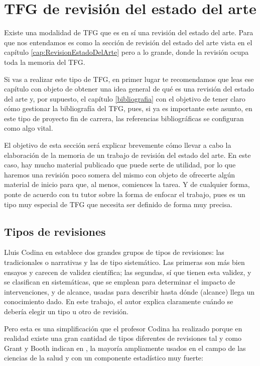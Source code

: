 \section{TFG de revisión del estado del arte}

Existe una modalidad de TFG que es en sí una revisión del estado del arte. Para que nos entendamos es como la sección de revisión del estado del arte vista en el capítulo \ref{cap:RevisionEstadoDelArte} pero a lo grande, donde la revisión ocupa toda la memoria del TFG.

Si vas a realizar este tipo de TFG, en primer lugar te recomendamos que leas ese capítulo con objeto de obtener una idea general de qué es una revisión del estado del arte y, por supuesto, el capítulo \ref{bibliografia} con el objetivo de tener claro cómo gestionar la bibliografía del TFG, pues, si ya es importante este asunto, en este tipo de proyecto fin de carrera, las referencias bibliográficas se configuran como algo vital.

El objetivo de esta sección será explicar brevemente cómo llevar a cabo la elaboración de la memoria de un trabajo de revisión del estado del arte. En este caso, hay mucho material publicado que puede serte de utilidad, por lo que haremos una revisión poco somera del mismo con objeto de ofrecerte algún material de inicio para que, al menos, comiences la tarea. Y de cualquier forma, ponte de acuerdo con tu tutor sobre la forma de enfocar el trabajo, pues es un tipo muy especial de TFG que necesita ser definido de forma muy precisa.

\subsection{Tipos de revisiones}

Lluis Codina en \cite{codina2024lluis} establece dos grandes grupos de tipos de revisiones: las tradicionales o narrativas y las de tipo sistemático. Las primeras son más bien ensayos y carecen de validez científica; las segundas, sí que tienen esta validez, y se clasifican en sistemáticas, que se emplean para determinar el impacto de intervenciones, y de alcance, usadas para describir hasta dónde (alcance) llega un conocimiento dado. En este trabajo, el autor explica claramente cuándo se debería elegir un tipo u otro de revisión.

Pero esta es una simplificación que el profesor Codina ha realizado porque en realidad existe una gran cantidad de tipos diferentes de revisiones tal y como Grant y Booth indican en \cite{grant2009maria}, la mayoría ampliamente usados en el campo de las ciencias de la salud y con un componente estadístico muy fuerte:

